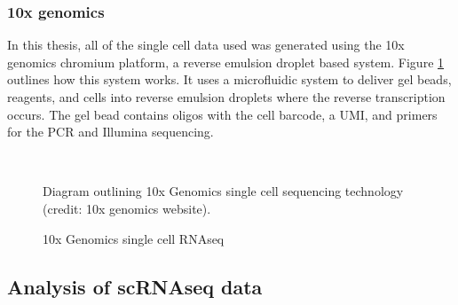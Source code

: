 \subsubsection{10x genomics}

\par{
In this thesis, all of the single cell data used was generated using the 10x genomics chromium platform, a reverse emulsion droplet based system. Figure \ref{figure:10xsinglecell} outlines how this system works. It uses a microfluidic system to deliver gel beads, reagents, and cells into reverse emulsion droplets where the reverse transcription occurs. The gel bead contains oligos with the cell barcode, a UMI, and primers for the PCR and Illumina sequencing\cite{10xsinglecell}.
}
\begin{figure}[htbp!]
\caption{10x Genomics single cell RNAseq}
\label{figure:10xsinglecell}
\begin{centering}
 \\
\par{Diagram outlining 10x Genomics single cell sequencing technology (credit: 10x genomics website).}
\end{centering}
\end{figure}

\subsection{Analysis of scRNAseq data}

